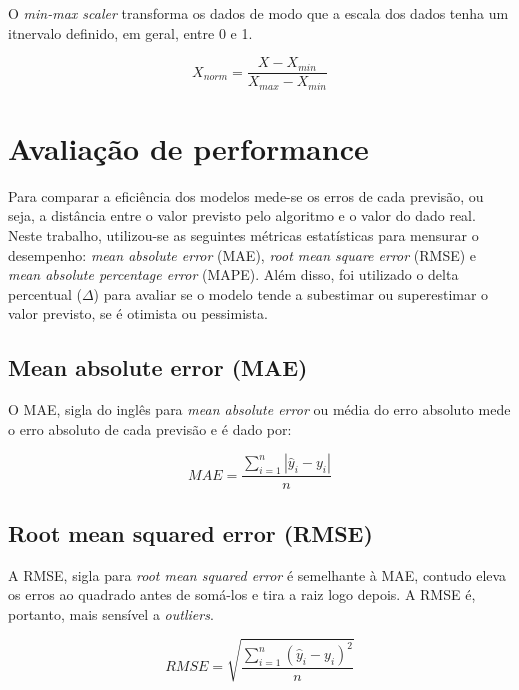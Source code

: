 O \textit{min-max scaler} transforma os dados de modo que a 
escala dos dados tenha um itnervalo definido, em geral, entre
0 e 1.

\begin{equation}
  X_{norm} = \frac{X - X_{min}}{X_{max} - X_{min}}
\end{equation}




\section{Avaliação de performance}

Para comparar a eficiência dos modelos mede-se os erros de 
cada previsão, ou seja, a distância entre o valor previsto 
pelo algoritmo e o valor do dado real. Neste trabalho, 
utilizou-se as seguintes métricas estatísticas para 
mensurar o desempenho: \textit{mean absolute error} (MAE),
\textit{root mean square  error} (RMSE) e \textit{mean 
absolute percentage error} (MAPE). Além disso, foi utilizado
o delta percentual ($\Delta$) para avaliar se o modelo tende 
a subestimar ou superestimar o valor previsto, se é otimista
ou pessimista.

\subsection{Mean absolute error (MAE)}

    O MAE, sigla do inglês para \textit{mean absolute error}
    ou média do erro absoluto mede o erro absoluto de cada previsão
    e é dado por:\cite{forecast-evaluation-ds}

    \begin{equation}
        MAE = \frac{\sum_{i=1}^n |\hat{y}_i - y_i|}{n}
    \end{equation}

\subsection{Root mean squared error (RMSE)}

    A RMSE, sigla para \textit{root mean squared  error} é
    semelhante à MAE, contudo eleva os erros ao quadrado antes de 
    somá-los e tira a raiz logo depois. A RMSE é, portanto, 
    mais sensível a \textit{outliers}.\cite{forecast-evaluation-ds}

    \begin{equation}
        RMSE = \sqrt{\frac{\sum_{i=1}^n (\hat{y}_i - y_i)^2}{n}}
    \end{equation}

